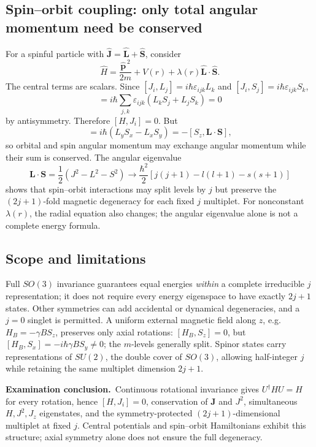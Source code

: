 \documentclass[11pt,a4paper]{article}
\theoremstyle{definition}
\newcommand{\exam}[1]{\par\medskip\noindent\textbf{Examination conclusion.}\ #1\par}
\begin{document}
\subsection{Spin--orbit coupling: only total angular momentum need be conserved}
For a spinful particle with \(\hat{\mathbf J}=\hat{\mathbf L}+\hat{\mathbf S}\), consider
\begin{equation}
\hat H=\frac{\hat{\mathbf p}^{\,2}}{2m}+V(r)+\lambda(r)\hat{\mathbf L}\cdot\hat{\mathbf S}.
\end{equation}
The central terms are scalars. Since \([J_i,L_j]=i\hbar\varepsilon_{ijk}L_k\) and \([J_i,S_j]=i\hbar\varepsilon_{ijk}S_k\),
\begin{equation}
[J_i,\mathbf L\cdot\mathbf S]=i\hbar\sum_{j,k}\varepsilon_{ijk}(L_kS_j+L_jS_k)=0
\end{equation}
by antisymmetry. Therefore \([H,J_i]=0\). But
\begin{equation}
[L_z,\mathbf L\cdot\mathbf S]=i\hbar(L_yS_x-L_xS_y)
=-[S_z,\mathbf L\cdot\mathbf S],
\end{equation}
so orbital and spin angular momentum may exchange angular momentum while their sum is conserved. The angular eigenvalue
\begin{equation}
\boxed{\mathbf L\cdot\mathbf S=\frac12(J^2-L^2-S^2)
\longrightarrow\frac{\hbar^2}{2}[j(j+1)-l(l+1)-s(s+1)]}
\end{equation}
shows that spin--orbit interactions may split levels by \(j\) but preserve the \((2j+1)\)-fold magnetic degeneracy for each fixed \(j\) multiplet. For nonconstant \(\lambda(r)\), the radial equation also changes; the angular eigenvalue alone is not a complete energy formula.
\subsection{Scope and limitations}
Full \(SO(3)\) invariance guarantees equal energies \emph{within} a complete irreducible \(j\) representation; it does not require every energy eigenspace to have exactly \(2j+1\) states. Other symmetries can add accidental or dynamical degeneracies, and a \(j=0\) singlet is permitted. A uniform external magnetic field along \(z\), e.g. \(H_B=-\gamma B S_z\), preserves only axial rotations: \([H_B,S_z]=0\), but \([H_B,S_x]=-i\hbar\gamma B S_y\ne0\); the \(m\)-levels generally split. Spinor states carry representations of \(SU(2)\), the double cover of \(SO(3)\), allowing half-integer \(j\) while retaining the same multiplet dimension \(2j+1\).
\exam{Continuous rotational invariance gives \(U^\dagger H U=H\) for every rotation, hence \([H,J_i]=0\), conservation of \(\mathbf J\) and \(J^2\), simultaneous \(H,J^2,J_z\) eigenstates, and the symmetry-protected \((2j+1)\)-dimensional multiplet at fixed \(j\). Central potentials and spin--orbit Hamiltonians exhibit this structure; axial symmetry alone does not ensure the full degeneracy.}
\end{document}
